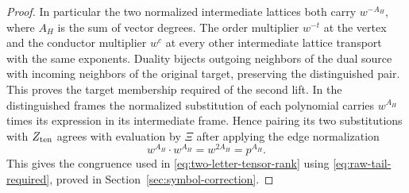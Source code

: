 \begin{proof}
In particular the two normalized intermediate lattices both
carry \(w^{-A_H}\), where \(A_H\) is the sum of vector
degrees. The order multiplier \(w^{-t}\) at the vertex and the
conductor multiplier \(w^c\) at every other intermediate
lattice transport with the same exponents. Duality bijects
outgoing neighbors of the dual source with incoming neighbors
of the original target, preserving the distinguished pair.
This proves the target membership required of the second lift.
In the distinguished frames the normalized substitution of
each polynomial carries \(w^{A_H}\) times its expression in
its intermediate frame. Hence pairing its two substitutions
with \(Z_{\rm ten}\) agrees with evaluation by \(\Xi\) after applying the edge normalization
\[
 w^{A_H}\cdot w^{A_H}=w^{2A_H}=p^{A_H}.
\]
This gives the congruence used in
\eqref{eq:two-letter-tensor-rank} using
\eqref{eq:raw-tail-required}, proved in Section~\ref{sec:symbol-correction}.
\end{proof}
